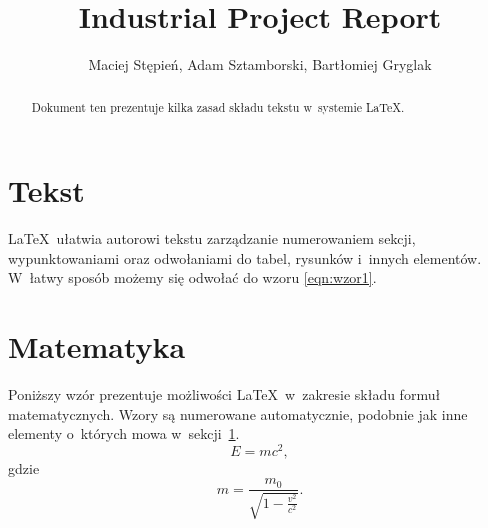 \documentclass[11pt,a4paper]{article}
\title{Industrial Project Report}
\author{Maciej Stępień, Adam Sztamborski, Bartłomiej Gryglak}
\date{}
\begin{document}
\maketitle
\pagebreak

\tableofcontents
\pagebreak

\begin{abstract}
Dokument ten prezentuje kilka zasad składu tekstu
w~systemie \LaTeX.
\end{abstract}
\section{Tekst}\label{sec:tekst}
\LaTeX\ ułatwia autorowi tekstu zarządzanie
numerowaniem sekcji, wypunktowaniami oraz odwołaniami
do tabel, rysunków i~innych elementów. W~łatwy sposób
możemy się odwołać do wzoru \ref{eqn:wzor1}.
\pagebreak

\section{Matematyka}\label{sec:matematyka}
Poniższy wzór prezentuje możliwości \LaTeX\ w~zakresie
składu formuł matematycznych. Wzory są numerowane
automatycznie, podobnie jak inne elementy o~których
mowa w~sekcji~\ref{sec:tekst}.
\begin{equation}
    E = mc^2,
    \label{eqn:wzor1}
\end{equation}
gdzie
\begin{equation}
    m = \frac{m_0}{\sqrt{1-\frac{v^2}{c^2}}}.
\end{equation}
\end{document}
